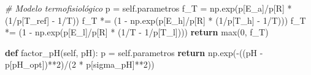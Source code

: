 \documentclass[
]{article}
\newenvironment{Shaded}{}{}
\newcommand{\BuiltInTok}[1]{\textcolor[rgb]{0.00,0.50,0.00}{#1}}
\newcommand{\CommentTok}[1]{\textcolor[rgb]{0.38,0.63,0.69}{\textit{#1}}}
\newcommand{\ControlFlowTok}[1]{\textcolor[rgb]{0.00,0.44,0.13}{\textbf{#1}}}
\newcommand{\DecValTok}[1]{\textcolor[rgb]{0.25,0.63,0.44}{#1}}
\newcommand{\KeywordTok}[1]{\textcolor[rgb]{0.00,0.44,0.13}{\textbf{#1}}}
\newcommand{\NormalTok}[1]{#1}
\newcommand{\OperatorTok}[1]{\textcolor[rgb]{0.40,0.40,0.40}{#1}}
\newcommand{\StringTok}[1]{\textcolor[rgb]{0.25,0.44,0.63}{#1}}
\newcommand{\VariableTok}[1]{\textcolor[rgb]{0.10,0.09,0.49}{#1}}
\begin{document}
\begin{Shaded}
\begin{Highlighting}[]
        \CommentTok{\# Modelo termofisiológico}
\NormalTok{        p }\OperatorTok{=} \VariableTok{self}\NormalTok{.parametros}
\NormalTok{        f\_T }\OperatorTok{=}\NormalTok{ np.exp(p[}\StringTok{\textquotesingle{}E\_a\textquotesingle{}}\NormalTok{]}\OperatorTok{/}\NormalTok{p[}\StringTok{\textquotesingle{}R\textquotesingle{}}\NormalTok{] }\OperatorTok{*}\NormalTok{ (}\DecValTok{1}\OperatorTok{/}\NormalTok{p[}\StringTok{\textquotesingle{}T\_ref\textquotesingle{}}\NormalTok{] }\OperatorTok{{-}} \DecValTok{1}\OperatorTok{/}\NormalTok{T))}
\NormalTok{        f\_T }\OperatorTok{*=}\NormalTok{ (}\DecValTok{1} \OperatorTok{{-}}\NormalTok{ np.exp(p[}\StringTok{\textquotesingle{}E\_h\textquotesingle{}}\NormalTok{]}\OperatorTok{/}\NormalTok{p[}\StringTok{\textquotesingle{}R\textquotesingle{}}\NormalTok{] }\OperatorTok{*}\NormalTok{ (}\DecValTok{1}\OperatorTok{/}\NormalTok{p[}\StringTok{\textquotesingle{}T\_h\textquotesingle{}}\NormalTok{] }\OperatorTok{{-}} \DecValTok{1}\OperatorTok{/}\NormalTok{T)))}
\NormalTok{        f\_T }\OperatorTok{*=}\NormalTok{ (}\DecValTok{1} \OperatorTok{{-}}\NormalTok{ np.exp(p[}\StringTok{\textquotesingle{}E\_l\textquotesingle{}}\NormalTok{]}\OperatorTok{/}\NormalTok{p[}\StringTok{\textquotesingle{}R\textquotesingle{}}\NormalTok{] }\OperatorTok{*}\NormalTok{ (}\DecValTok{1}\OperatorTok{/}\NormalTok{T }\OperatorTok{{-}} \DecValTok{1}\OperatorTok{/}\NormalTok{p[}\StringTok{\textquotesingle{}T\_l\textquotesingle{}}\NormalTok{])))}
        \ControlFlowTok{return} \BuiltInTok{max}\NormalTok{(}\DecValTok{0}\NormalTok{, f\_T)}
    
    \KeywordTok{def}\NormalTok{ factor\_pH(}\VariableTok{self}\NormalTok{, pH):}
\NormalTok{        p }\OperatorTok{=} \VariableTok{self}\NormalTok{.parametros}
        \ControlFlowTok{return}\NormalTok{ np.exp(}\OperatorTok{{-}}\NormalTok{((pH }\OperatorTok{{-}}\NormalTok{ p[}\StringTok{\textquotesingle{}pH\_opt\textquotesingle{}}\NormalTok{])}\OperatorTok{**}\DecValTok{2}\NormalTok{)}\OperatorTok{/}\NormalTok{(}\DecValTok{2} \OperatorTok{*}\NormalTok{ p[}\StringTok{\textquotesingle{}sigma\_pH\textquotesingle{}}\NormalTok{]}\OperatorTok{**}\DecValTok{2}\NormalTok{))}
    

\end{Highlighting}
\end{Shaded}
\end{document}
